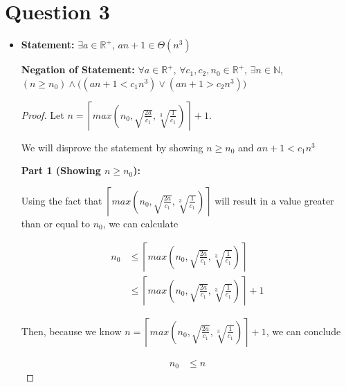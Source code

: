 \documentclass[12pt]{article}
\begin{document}
\section*{Question 3}
\begin{itemize}
    \item

    \textbf{Statement:} $\exists a \in \mathbb{R}^{+}$, $an + 1 \in \Theta(n^3)$

    \bigskip

    \textbf{Negation of Statement:} $\forall a \in \mathbb{R}^{+}$,
    $\forall c_1,c_2,n_0 \in \mathbb{R}^{+}$, $\exists n \in \mathbb{N}$,
    $(n \geq n_0) \land \bigl( (an+1 < c_1n^3) \lor (an+1 > c_2n^3) \bigr)$

    \bigskip

    \begin{proof}

    Let $n = \left\lceil max(n_0, \sqrt{\frac{2a}{c_1}}, \sqrt[3]{\frac{1}{c_1}}) \right\rceil + 1$.

    \bigskip

    We will disprove the statement by showing $n \geq n_0$ and $an+1 < c_1n^3$

    \bigskip

    \textbf{Part 1 (Showing $n \geq n_0$):}

    \bigskip

    Using the fact that $\left\lceil max(n_0, \sqrt{\frac{2a}{c_1}}, \sqrt[3]{\frac{1}{c_1}}) \right\rceil$
    will result in a value greater than or equal to $n_0$, we can calculate

    \setcounter{equation}{0}
    \begin{align}
        n_0 &\leq \left\lceil max(n_0, \sqrt{\frac{2a}{c_1}}, \sqrt[3]{\frac{1}{c_1}}) \right\rceil\\
        &\leq \left\lceil max(n_0, \sqrt{\frac{2a}{c_1}}, \sqrt[3]{\frac{1}{c_1}}) \right\rceil + 1
    \end{align}

    \bigskip

    Then, because we know $n = \left\lceil max(n_0, \sqrt{\frac{2a}{c_1}},
    \sqrt[3]{\frac{1}{c_1}}) \right\rceil + 1$, we can conclude

    \begin{align}
       n_0 &\leq n
    \end{align}

    \end{proof}

    \bigskip


\end{itemize}
\end{document}
